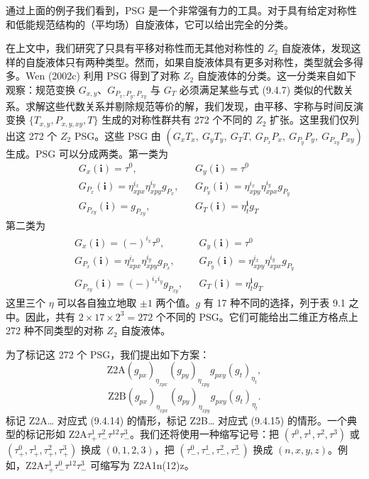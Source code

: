 通过上面的例子我们看到，PSG 是一个非常强有力的工具。对于具有给定对称性和低能规范结构的（平均场）自旋液体，它可以给出完全的分类。

在上文中，我们研究了只具有平移对称性而无其他对称性的 $Z_2$ 自旋液体，发现这样的自旋液体只有两种类型。然而，如果自旋液体具有更多对称性，类型就会多得多。Wen (2002c) 利用 PSG 得到了对称 $Z_2$ 自旋液体的分类。这一分类来自如下观察：规范变换 $G_{x,y}$、$G_{P_x,P_y,P_{xy}}$ 与 $G_T$ 必须满足某些与式 (9.4.7) 类似的代数关系。求解这些代数关系并剔除规范等价的解，我们发现，由平移、宇称与时间反演变换 $\{T_{x,y},P_{x,y,xy},T\}$ 生成的对称性群共有 272 个不同的 $Z_2$ 扩张。这里我们仅列出这 272 个 $Z_2$ PSG。这些 PSG 由 $(G_xT_x,\ G_yT_y,\ G_TT,\ G_{P_x}P_x,\ G_{P_y}P_y,\ G_{P_{xy}}P_{xy})$ 生成。PSG 可以分成两类。第一类为
\begin{equation*}
\begin{array}{rcl}
G_x(\pmb{i})=\tau^0, & & G_y(\pmb{i})=\tau^0\\[2pt]
G_{P_x}(\pmb{i})=\eta_{xpx}^{i_x}\eta_{xpy}^{i_y}g_{P_x}, & & G_{P_y}(\pmb{i})=\eta_{xpy}^{i_x}\eta_{xpx}^{i_y}g_{P_y}\\[2pt]
G_{P_{xy}}(\pmb{i})=g_{P_{xy}}, & & G_T(\pmb{i})=\eta_t^{\pmb{i}}g_T
\end{array}
\tag{9.4.14}
\end{equation*}
第二类为
\begin{equation*}
\begin{array}{rcl}
G_x(\pmb{i})=(-)^{i_x}\tau^0, & & G_y(\pmb{i})=\tau^0\\[2pt]
G_{P_x}(\pmb{i})=\eta_{xpx}^{i_x}\eta_{xpy}^{i_y}g_{P_x}, & & G_{P_y}(\pmb{i})=\eta_{xpy}^{i_x}\eta_{xpx}^{i_y}g_{P_y}\\[2pt]
G_{P_{xy}}(\pmb{i})=(-)^{i_x i_y}g_{P_{xy}}, & & G_T(\pmb{i})=\eta_t^{\pmb{i}}g_T
\end{array}
\tag{9.4.15}
\end{equation*}
这里三个 $\eta$ 可以各自独立地取 $\pm1$ 两个值。$g$ 有 17 种不同的选择，列于表 9.1 之中。因此，共有 $2\times17\times2^{3}=272$ 个不同的 PSG。它们可能给出二维正方格点上 272 种不同类型的对称 $Z_2$ 自旋液体。

为了标记这 272 个 PSG，我们提出如下方案：
\begin{equation*}
\text{Z2A}(g_{px})_{\eta_{xpx}}(g_{py})_{\eta_{xpy}}g_{pxy}(g_t)_{\eta_t},
\tag{9.4.16}
\end{equation*}
\begin{equation*}
\text{Z2B}(g_{px})_{\eta_{xpx}}(g_{py})_{\eta_{xpy}}g_{pxy}(g_t)_{\eta_t}.
\tag{9.4.17}
\end{equation*}
标记 Z2A… 对应式 (9.4.14) 的情形，标记 Z2B… 对应式 (9.4.15) 的情形。一个典型的标记形如 $\text{Z2A}\tau_{+}^{1}\tau_{-}^{2}\tau^{12}\tau_{-}^{3}$。我们还将使用一种缩写记号：把 $(\tau^{0},\tau^{1},\tau^{2},\tau^{3})$ 或 $(\tau_{+}^{0},\tau_{+}^{1},\tau_{+}^{2},\tau_{+}^{3})$ 换成 $(0,1,2,3)$，把 $(\tau_{-}^{0},\tau_{-}^{1},\tau_{-}^{2},\tau_{-}^{3})$ 换成 $(n,x,y,z)$。例如，$\text{Z2A}\tau_{+}^{1}\tau_{-}^{0}\tau^{12}\tau_{-}^{3}$ 可缩写为 Z2A1n(12)z。

